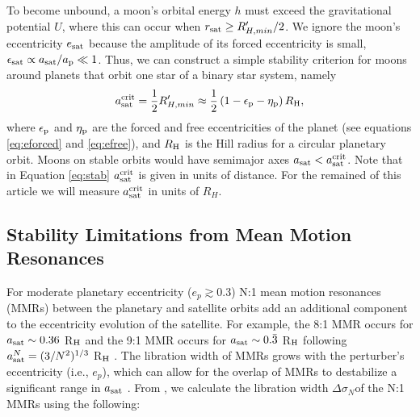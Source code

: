 \documentclass[preprint]{aastex63}
\begin{document}
To become unbound, a moon's orbital energy $h$ must exceed the gravitational potential $U$, where this can occur when $r_{\rm sat} \geq R^\prime_{H,min}/2$.  We ignore the moon's eccentricity $e_{\rm sat}$ because the amplitude of its forced eccentricity is small, $\epsilon_{\rm sat} \propto a_{\rm sat}/a_{\rm p} \ll 1$.  Thus, we can construct a simple stability criterion for moons around planets that orbit one star of a binary star system, namely 
\begin{equation}
    a_{\rm sat}^{\rm crit} = \frac{1}{2}R^\prime_{H,min} \approx \frac{1}{2} \left(1-\epsilon_{\rm p}-\eta_{\rm p} \right) R_{\rm H},
	\label{eq:stab}
\end{equation}
where $\epsilon_{\rm p}$ and $\eta_{\rm p}$ are the forced and free eccentricities of the planet (see equations \ref{eq:eforced} and \ref{eq:efree}), and $R_{\rm H}$ is the Hill radius for a circular planetary orbit.  Moons on stable orbits would have semimajor axes $a_{\rm sat} < a_{\rm sat}^{\rm crit}$. Note that in Equation \ref{eq:stab} $a_{\rm sat}^{\rm crit}$ is given in units of distance. For the remained of this article we will measure $a_{\rm sat}^{\rm crit}$ in units of $R_H$.


\subsection{Stability Limitations from Mean Motion Resonances}
For moderate planetary eccentricity ($e_p \gtrsim 0.3$) N:1 mean motion resonances (MMRs) between the planetary and satellite orbits add an additional component to the eccentricity evolution of the satellite.  For example, the 8:1 MMR occurs for $a_{\rm sat}\sim0.36$ R$_{\rm H}$ and the 9:1 MMR occurs for $a_{\rm sat}\sim0.\bar{3}$ R$_{\rm H}$ following $a_{\rm sat}^{N} = (3/N^2)^{1/3}$ R$_{\rm H}$ {\citep{Kipping2009a,Rosario-Franco2020}}.  The libration width of MMRs grows with the perturber's eccentricity (i.e., $e_p$), which can allow for the overlap of MMRs to destabilize a significant range in $a_{\rm sat}$ \citep{Murray1999,Mudryk2006,Morais2012}.  From \cite{Mardling2013}, we calculate the libration width $\Delta\sigma_N$of the N:1 MMRs using the following:
\end{document}
